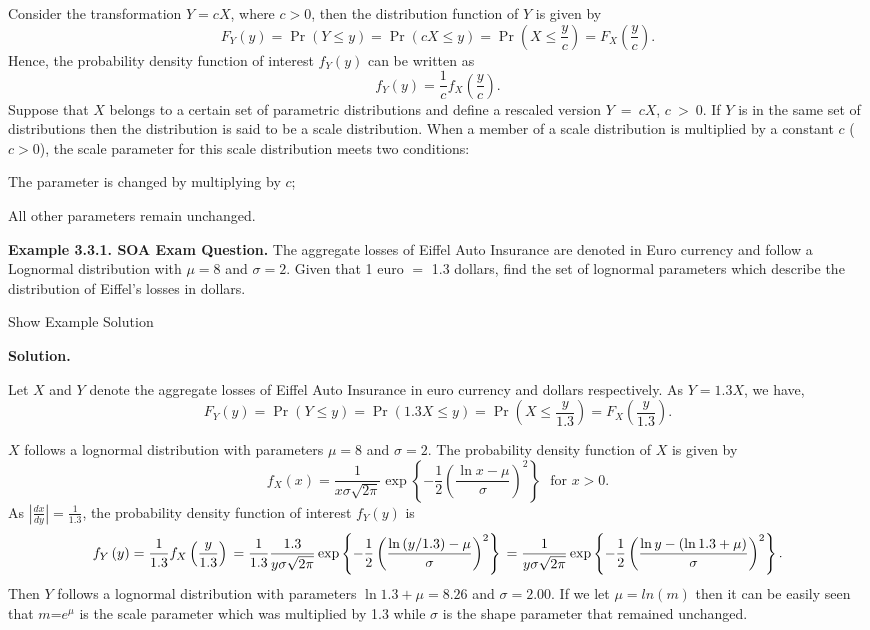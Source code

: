 \documentclass[]{book}
\theoremstyle{definition}
\theoremstyle{definition}
\theoremstyle{definition}
\theoremstyle{remark}
\begin{document}
Consider the transformation \(Y = cX\), where \(c > 0\), then the
distribution function of \(Y\) is given by
\[F_{Y}\left( y \right) = \Pr\left( Y \leq y \right) = \Pr\left( cX \leq y \right) = \Pr\left( X \leq \frac{y}{c} \right) = F_{X}\left( \frac{y}{c} \right).\]
Hence, the probability density function of interest \(f_{Y}(y)\) can be
written as
\[f_{Y}\left( y \right) = \frac{1}{c}f_{X}\left( \frac{y}{c} \right).\]
Suppose that \(X\) belongs to a certain set of parametric distributions
and define a rescaled version \(Y\  = \ cX\), \(c\  > \ 0\). If \(Y\) is
in the same set of distributions then the distribution is said to be a
scale distribution. When a member of a scale distribution is multiplied
by a constant \(c\) (\(c > 0\)), the scale parameter for this scale
distribution meets two conditions:

The parameter is changed by multiplying by \(c\);

All other parameters remain unchanged.

\textbf{Example 3.3.1. SOA Exam Question.} The aggregate losses of
Eiffel Auto Insurance are denoted in Euro currency and follow a
Lognormal distribution with \(\mu = 8\) and \(\sigma = 2\). Given that 1
euro \(=\) 1.3 dollars, find the set of lognormal parameters which
describe the distribution of Eiffel's losses in dollars.

Show Example Solution

\hypertarget{toggleExampleLoss.3.1}{}
\textbf{Solution.}

Let \(X\) and \(Y\) denote the aggregate losses of Eiffel Auto Insurance
in euro currency and dollars respectively. As \(Y = 1.3X\), we have,
\[F_{Y}\left( y \right) = \Pr\left( Y \leq y \right) = \Pr\left( 1.3X \leq y \right) = \Pr\left( X \leq \frac{y}{1.3} \right) = F_{X}\left( \frac{y}{1.3} \right).\]

\(X\) follows a lognormal distribution with parameters \(\mu = 8\) and
\(\sigma = 2\). The probability density function of \(X\) is given by
\[f_{X}\left( x \right) = \frac{1}{x \sigma \sqrt{2\pi}}\exp \left\{- \frac{1}{2}\left( \frac{\ln x - \mu}{\sigma} \right)^{2}\right\} \ \ \ \text{for } x > 0.\]
As \(\left| \frac{dx}{dy} \right| = \frac{1}{1.3}\), the probability
density function of interest \(f_{Y}(y)\) is
\[f_{Y}\left( y \right) = \frac{1}{1.3}f_{X}\left( \frac{y}{1.3} \right) \\
= \frac{1}{1.3}\frac{1.3}{y \sigma \sqrt{2\pi}}\exp \left\{- \frac{1}{2}\left( \frac{\ln\left( y/1.3 \right) - \mu}{\sigma} \right)^{2}\right\} \\
= \frac{1}{y \sigma\sqrt{2\pi}}\exp \left\{- \frac{1}{2}\left( \frac{\ln y - \left( \ln 1.3 + \mu \right)}{\sigma} \right)^{2}\right\}.\]
Then \(Y\) follows a lognormal distribution with parameters
\(\ln 1.3 + \mu = 8.26\) and \(\sigma = 2.00\). If we let
\(\mu = ln(m)\) then it can be easily seen that \(m\)=\(e^{\mu}\) is the
scale parameter which was multiplied by 1.3 while \(\sigma\) is the
shape parameter that remained unchanged.
\end{document}
